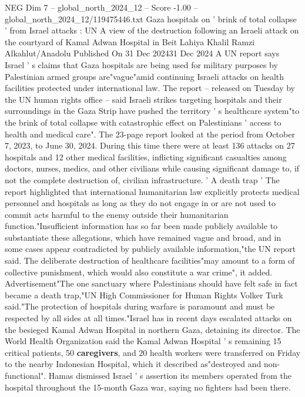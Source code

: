 \begin{textsample}{NEG Dim 7 – global\_north\_2024\_12 – Score -1.00 – global\_north\_2024\_12/119475446.txt}  \label{ex:f7_neg_169}
Gaza hospitals on ' brink of total collapse ' from Israel attacks : UN A view of the destruction following an Israeli attack on the courtyard of Kamal Adwan Hospital in Beit Lahiya Khalil Ramzi Alkahlut/Anadolu Published On 31 Dec 202431 Dec 2024 A UN report says Israel ' s claims that Gaza hospitals are being used for military purposes by Palestinian armed groups are"vague"amid continuing Israeli attacks on health facilities protected under international law.
The report -- released on Tuesday by the UN human rights office -- said Israeli strikes targeting hospitals and their surroundings in the Gaza Strip have pushed the territory ' s healthcare system"to the brink of total collapse with catastrophic effect on Palestinians ' access to health and medical care".
The 23-page report looked at the period from October 7, 2023, to June 30, 2024.
During this time there were at least 136 attacks on 27 hospitals and 12 other medical facilities, inflicting significant casualties among doctors, nurses, medics, and other civilians while causing significant damage to, if not the complete destruction of, civilian infrastructure. ' A death trap ' The report highlighted that international humanitarian law explicitly protects medical personnel and hospitals as long as they do not engage in or are not used to commit acts harmful to the enemy outside their humanitarian function."Insufficient information has so far been made publicly available to substantiate these allegations, which have remained vague and broad, and in some cases appear contradicted by publicly available information,"the UN report said.
The deliberate destruction of healthcare facilities"may amount to a form of collective punishment, which would also constitute a war crime", it added.
Advertisement"The one sanctuary where Palestinians should have felt safe in fact became a death trap,"UN High Commissioner for Human Rights Volker Turk said."The protection of hospitals during warfare is paramount and must be respected by all sides at all times."Israel has in recent days escalated attacks on the besieged Kamal Adwan Hospital in northern Gaza, detaining its director.
The World Health Organization said the Kamal Adwan Hospital ' s remaining 15 critical patients, 50 \textbf{caregivers}, and 20 health workers were transferred on Friday to the nearby Indonesian Hospital, which it described as"destroyed and non-functional".
Hamas dismissed Israel ' s assertion its members operated from the hospital throughout the 15-month Gaza war, saying no fighters had been there.

\end{textsample}
